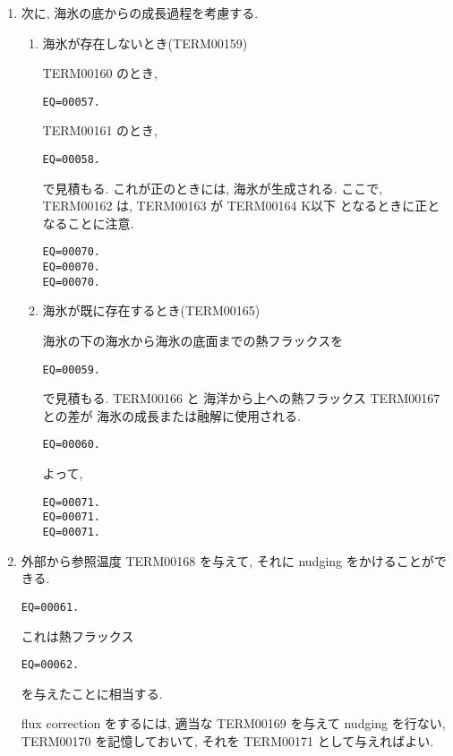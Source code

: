 \begin{enumerate}
\item 次に, 海氷の底からの成長過程を考慮する.

\begin{enumerate}
\item 海氷が存在しないとき(TERM00159)

TERM00160 のとき, 
\begin{verbatim}
EQ=00057.
\end{verbatim}
TERM00161 のとき, 
\begin{verbatim}
EQ=00058.
\end{verbatim}
で見積もる.
これが正のときには, 海氷が生成される.
ここで,  TERM00162 は, TERM00163 が TERM00164 K以下
となるときに正となることに注意.
\begin{verbatim}
EQ=00070.
EQ=00070.
EQ=00070.
\end{verbatim}

\item 海氷が既に存在するとき(TERM00165)

海氷の下の海水から海氷の底面までの熱フラックスを
\begin{verbatim}
EQ=00059.
\end{verbatim}
で見積もる.
TERM00166 と 海洋から上への熱フラックス TERM00167 との差が
海氷の成長または融解に使用される.
\begin{verbatim}
EQ=00060.
\end{verbatim}
よって,
\begin{verbatim}
EQ=00071.
EQ=00071.
EQ=00071.
\end{verbatim}
\end{enumerate}

\item 外部から参照温度 TERM00168 を与えて,
      それに nudging をかけることができる.
%      
      \begin{verbatim}
EQ=00061.
\end{verbatim}
%
      これは熱フラックス 
      \begin{verbatim}
EQ=00062.
\end{verbatim}
      を与えたことに相当する.

      flux correction をするには,
      適当な TERM00169 を与えて nudging を行ない,
      TERM00170 を記憶しておいて,
      それを TERM00171 として与えればよい.

\end{enumerate}



